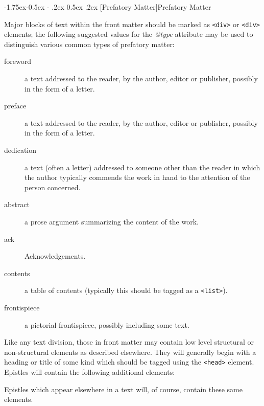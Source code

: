 \documentclass[11pt,twoside]{article}\makeatletter
\makeatletter
\renewcommand\subsection{\@startsection{subsection}{2}{\z@}%
     {-1.75ex\@plus -0.5ex \@minus- .2ex}%
     {0.5ex \@plus .2ex}%
     {\reset@font\Large\sffamily}}
\renewcommand\subsubsection{\@startsection{subsubsection}{3}{\z@}%
     {-1.5ex\@plus -0.35ex \@minus -.2ex}%
     {0.5ex \@plus .2ex}%
     {\reset@font\large\sffamily}}
\def\DivIII{\subsubsection}
\def\DivIII{\subsection}
\makeatother
\begin{document}
\DivIII[Prefatory Matter]{Prefatory Matter}\label{h52}\par
Major blocks of text within the front matter should be marked as \texttt{<div>} or \texttt{<div>} elements; the following suggested values for the \textit{@type} attribute may be used to distinguish various common types of prefatory matter: \begin{description}

\item[foreword]a text addressed to the reader, by the author, editor or publisher, possibly in the form of a letter.
\item[preface]a text addressed to the reader, by the author, editor or publisher, possibly in the form of a letter.
\item[dedication]a text (often a letter) addressed to someone other than the reader in which the author typically commends the work in hand to the attention of the person concerned.
\item[abstract]a prose argument summarizing the content of the work.
\item[ack]Acknowledgements.
\item[contents]a table of contents (typically this should be tagged as a \texttt{<list>}).
\item[frontispiece]a pictorial frontispiece, possibly including some text.
\end{description} \par
Like any text division, those in front matter may contain low level structural or non-structural elements as described elsewhere. They will generally begin with a heading or title of some kind which should be tagged using the \texttt{<head>} element. Epistles will contain the following additional elements: \par
 Epistles which appear elsewhere in a text will, of course, contain these same elements.\par
\end{document}
